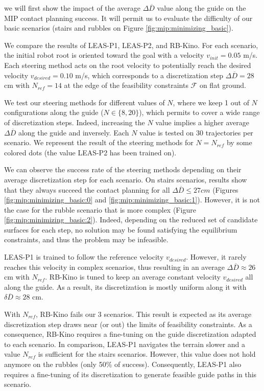 we will first show the impact of the average $\Delta \overline{D}$ value along the guide on the MIP contact planning success. 
It will permit us to evaluate the difficulty of our basic scenarios (stairs and rubbles on Figure \ref{fig:mip:minimizing_basic}). 

We compare the results of LEAS-P1, LEAS-P2, and RB-Kino.
For each scenario, the initial robot root is oriented toward the goal with a velocity $v_{init}=0.05$ m/s.
Each steering method acts on the root velocity to potentially reach the desired velocity $v_{desired}=0.10$ m/s, which corresponds to a discretization step $\Delta \overline{D}=28$ cm with $N_{ref}=14$ at the edge of the feasibility constraints $\mathcal{F}$ on flat ground.

We test our steering methods for different values of $N$, where we keep 1 out of $N$ configurations along the guide ($N \in \{8,20\}$), which permits to cover a wide range of discretization steps.
Indeed, increasing the $N$ value implies a higher average $\Delta \overline{D}$ along the guide and inversely.
Each $N$ value is tested on 30 trajectories per scenario.
We represent the result of the steering methods for $N=N_{ref}$ by some colored dots (the value LEAS-P2 has been trained on).

We can observe the success rate of the steering methods depending on their average discretization step for each scenario.
On stairs scenarios, results show that they always succeed the contact planning for all $\Delta \overline{D} \leq 27 cm$ (Figures \ref{fig:mip:minimizing_basic:0} and \ref{fig:mip:minimizing_basic:1}).
However, it is not the case for the rubble scenario that is more complex (Figure \ref{fig:mip:minimizing_basic:2}). Indeed, depending on the reduced set of candidate surfaces for each step, no solution may be found satisfying the equilibrium constraints, and thus the problem may be infeasible.

LEAS-P1 is trained to follow the reference velocity $v_{desired}$.
However, it rarely reaches this velocity in complex scenarios, thus resulting in an average $\Delta \overline{D} \approx 26$ cm with $N_{ref}$.
RB-Kino is tuned to keep an average constant velocity $v_{desired}$ all along the guide. As a result, its discretization is mostly uniform along it with $\delta \overline{D} \approx 28$ cm.

With $N_{ref}$, RB-Kino fails our 3 scenarios. This result is expected as its average discretization step draws near (or out) the limits of feasibility constraints.
As a consequence, RB-Kino requires a fine-tuning on the guide discretization adapted to each scenario.
In comparison, LEAS-P1 navigates the terrain slower and a value $N_{ref}$ is sufficient for the stairs scenarios. 
However, this value does not hold anymore on the rubbles (only 50\% of success). 
Consequently, LEAS-P1 also requires a fine-tuning of its discretization to generate feasible guide paths in this scenario.

